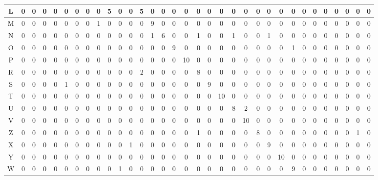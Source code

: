 \begin{table}[]
{\begin{tabular}{c|c|c|c|c|c|c|c|c|c|c|c|c|c|c|c|c|c|c|c|c|c|c|c|c|c|c|c|c|c|c|c|c}
L & 0 & 0  & 0 & 0 & 0 & 0 & 0 & 0 & 5 & 0  & 0 & 5 & 0 & 0 & 0 & 0  & 0 & 0 & 0  & 0 & 0  & 0 & 0 & 0  & 0 & 0 & 0 & 0  & 0  & 0 & 0 & 0  \\ \hline
M & 0 & 0  & 0 & 0 & 0 & 0 & 0 & 1 & 0 & 0  & 0 & 0 & 9 & 0 & 0 & 0  & 0 & 0 & 0  & 0 & 0  & 0 & 0 & 0  & 0 & 0 & 0 & 0  & 0  & 0 & 0 & 0  \\ \hline
N & 0 & 0  & 0 & 0 & 0 & 0 & 0 & 0 & 0 & 0  & 0 & 0 & 1 & 6 & 0 & 0  & 1 & 0 & 0  & 1 & 0  & 0 & 1 & 0  & 0 & 0 & 0 & 0  & 0  & 0 & 0 & 0  \\ \hline
O & 0 & 0  & 0 & 0 & 0 & 0 & 0 & 0 & 0 & 0  & 0 & 0 & 0 & 0 & 9 & 0  & 0 & 0 & 0  & 0 & 0  & 0 & 0 & 0  & 1 & 0 & 0 & 0  & 0  & 0 & 0 & 0  \\ \hline
P & 0 & 0  & 0 & 0 & 0 & 0 & 0 & 0 & 0 & 0  & 0 & 0 & 0 & 0 & 0 & 10 & 0 & 0 & 0  & 0 & 0  & 0 & 0 & 0  & 0 & 0 & 0 & 0  & 0  & 0 & 0 & 0  \\ \hline
R & 0 & 0  & 0 & 0 & 0 & 0 & 0 & 0 & 0 & 0  & 0 & 2 & 0 & 0 & 0 & 0  & 8 & 0 & 0  & 0 & 0  & 0 & 0 & 0  & 0 & 0 & 0 & 0  & 0  & 0 & 0 & 0  \\ \hline
S & 0 & 0  & 0 & 0 & 1 & 0 & 0 & 0 & 0 & 0  & 0 & 0 & 0 & 0 & 0 & 0  & 0 & 9 & 0  & 0 & 0  & 0 & 0 & 0  & 0 & 0 & 0 & 0  & 0  & 0 & 0 & 0  \\ \hline
T & 0 & 0  & 0 & 0 & 0 & 0 & 0 & 0 & 0 & 0  & 0 & 0 & 0 & 0 & 0 & 0  & 0 & 0 & 10 & 0 & 0  & 0 & 0 & 0  & 0 & 0 & 0 & 0  & 0  & 0 & 0 & 0  \\ \hline
U & 0 & 0  & 0 & 0 & 0 & 0 & 0 & 0 & 0 & 0  & 0 & 0 & 0 & 0 & 0 & 0  & 0 & 0 & 0  & 8 & 2  & 0 & 0 & 0  & 0 & 0 & 0 & 0  & 0  & 0 & 0 & 0  \\ \hline
V & 0 & 0  & 0 & 0 & 0 & 0 & 0 & 0 & 0 & 0  & 0 & 0 & 0 & 0 & 0 & 0  & 0 & 0 & 0  & 0 & 10 & 0 & 0 & 0  & 0 & 0 & 0 & 0  & 0  & 0 & 0 & 0  \\ \hline
Z & 0 & 0  & 0 & 0 & 0 & 0 & 0 & 0 & 0 & 0  & 0 & 0 & 0 & 0 & 0 & 0  & 1 & 0 & 0  & 0 & 0  & 8 & 0 & 0  & 0 & 0 & 0 & 0  & 0  & 0 & 1 & 0  \\ \hline
X & 0 & 0  & 0 & 0 & 0 & 0 & 0 & 0 & 0 & 0  & 1 & 0 & 0 & 0 & 0 & 0  & 0 & 0 & 0  & 0 & 0  & 0 & 9 & 0  & 0 & 0 & 0 & 0  & 0  & 0 & 0 & 0  \\ \hline
Y & 0 & 0  & 0 & 0 & 0 & 0 & 0 & 0 & 0 & 0  & 0 & 0 & 0 & 0 & 0 & 0  & 0 & 0 & 0  & 0 & 0  & 0 & 0 & 10 & 0 & 0 & 0 & 0  & 0  & 0 & 0 & 0  \\ \hline
W & 0 & 0  & 0 & 0 & 0 & 0 & 0 & 0 & 0 & 1  & 0 & 0 & 0 & 0 & 0 & 0  & 0 & 0 & 0  & 0 & 0  & 0 & 0 & 0  & 9 & 0 & 0 & 0  & 0  & 0 & 0 & 0  \\ \hline

\end{tabular}}
\end{table}
